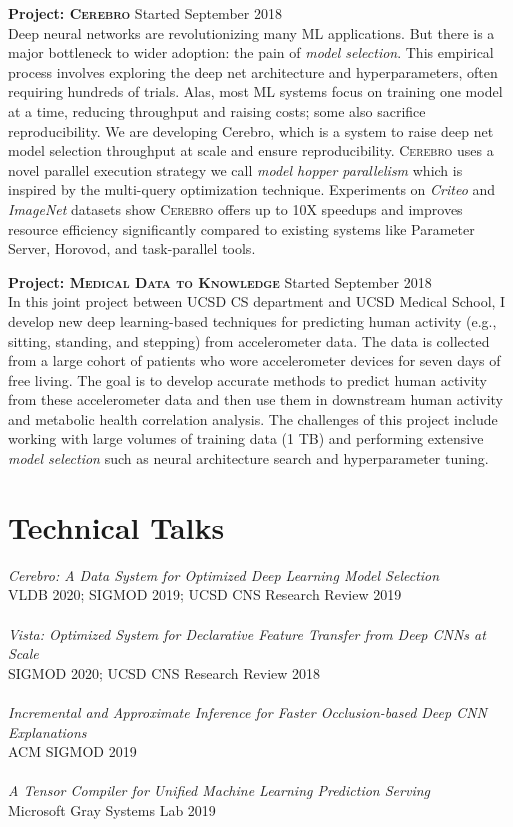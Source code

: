 \documentclass[margin]{res}
\begin{document}
\begin{resume}
\textbf{Project: \textsc{Cerebro}} \hfill Started September 2018\\
Deep neural networks are revolutionizing many ML applications.
But there is a major bottleneck to wider adoption: the pain of \textit{model selection}.
This empirical process involves exploring the deep net architecture and hyperparameters, often requiring hundreds of trials.
Alas, most ML systems focus on training one model at a time, reducing throughput and raising costs; some also sacrifice reproducibility.
We are developing {Cerebro}, which is a system to raise deep net model selection throughput at scale and ensure reproducibility.
\textsc{Cerebro} uses a novel parallel execution strategy we call \textit{model hopper parallelism} which is inspired by the multi-query optimization technique.
Experiments on \textit{Criteo} and \textit{ImageNet} datasets show \textsc{Cerebro} offers up to 10X speedups and improves resource efficiency significantly compared to existing systems like Parameter Server, Horovod, and task-parallel tools.


\textbf{Project: \textsc{Medical Data to Knowledge}} \hfill Started September 2018\\
In this joint project between UCSD CS department and UCSD Medical School, I develop new deep learning-based techniques for predicting human activity (e.g., sitting, standing, and stepping) from accelerometer data. The data is collected from a large cohort of patients who wore accelerometer devices for seven days of free living. The goal is to develop accurate methods to predict human activity from these accelerometer data and then use them in downstream human activity and metabolic health correlation analysis. The challenges of this project include working with large volumes of training data (1 TB) and performing extensive \textit{model selection} such as neural architecture search and hyperparameter tuning.


\section{Technical Talks}
\textit{Cerebro: A Data System for Optimized Deep Learning Model Selection}\\ VLDB 2020; SIGMOD 2019; UCSD CNS Research Review 2019\\\\
\textit{Vista: Optimized System for Declarative Feature Transfer from Deep CNNs at Scale}\\ SIGMOD 2020; UCSD CNS Research Review 2018\\\\
\textit{Incremental and Approximate Inference for Faster Occlusion-based Deep CNN Explanations}\\ ACM SIGMOD 2019\\\\
\textit{A Tensor Compiler for Unified Machine Learning Prediction Serving}\\ Microsoft Gray Systems Lab 2019\\


\end{resume}
\end{document}
